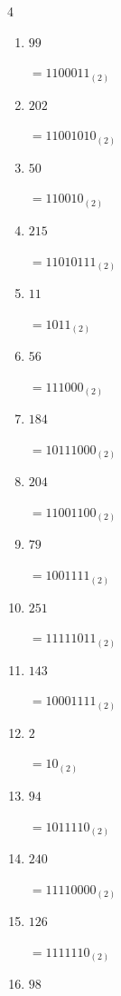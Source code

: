\begin{multicols}{4}
\begin{enumerate}
        $=11010110_{(2)}$

  \item $99$

        $=1100011_{(2)}$

  \item $202$

        $=11001010_{(2)}$

\columnbreak %

  \item $50$

        $=110010_{(2)}$

  \item $215$

        $=11010111_{(2)}$

  \item $11$

        $=1011_{(2)}$

  \item $56$

        $=111000_{(2)}$

  \item $184$

        $=10111000_{(2)}$

  \item $204$

        $=11001100_{(2)}$

  \item $79$

        $=1001111_{(2)}$

  \item $251$

        $=11111011_{(2)}$

  \item $143$

        $=10001111_{(2)}$

  \item $2$

        $=10_{(2)}$

  \item $94$

        $=1011110_{(2)}$

  \item $240$

        $=11110000_{(2)}$

  \item $126$

        $=1111110_{(2)}$

  \item $98$


\end{enumerate}
\end{multicols}
